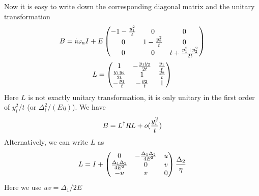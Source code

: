 Now it is easy to write down the corresponding diagonal matrix and the unitary transformation
\begin{equation}
B=i\omega_{n}I+E\begin{pmatrix}-1-\frac{y_{1}^{2}}{t}&0&0\\0&1-\frac{y_{2}^{2}}{t}&0\\0&0&t+\frac{y_{1}^{2}+y_{2}^{2}}{2t}\end{pmatrix}
\end{equation}
\begin{equation}
L=\begin{pmatrix}1&-\frac{y_{1}y_{2}}{2t}&\frac{y_{1}}{t}\\\frac{y_{1}y_{2}}{2t}&1&\frac{y_{2}}{t}\\-\frac{y_{1}}{t}&-\frac{y_{2}}{t}&1\end{pmatrix}
\end{equation}
Here $L$ is not exactly unitary transformation, it is only unitary in the first order of  $y_{i}^{2}/{t}$ (or $\Delta_{i}^{2}/(E\eta)$). We have 
\[
B=L^{\dagger}RL+o(\frac{y_{i}^{2}}{t})
\]
Alternatively, we can write $L$ as 
\begin{equation}
L=I+
\begin{pmatrix}0&-\frac{\Delta_{1}\Delta_{2}}{4E^{2}}&u\\
\frac{\Delta_{1}\Delta_{2}}{4E^{2}}&0&v\\
-u&v&0
\end{pmatrix}\frac{\Delta_{2}}{\eta}
\end{equation}
Here we use $uv=\Delta_{1}/2E$


